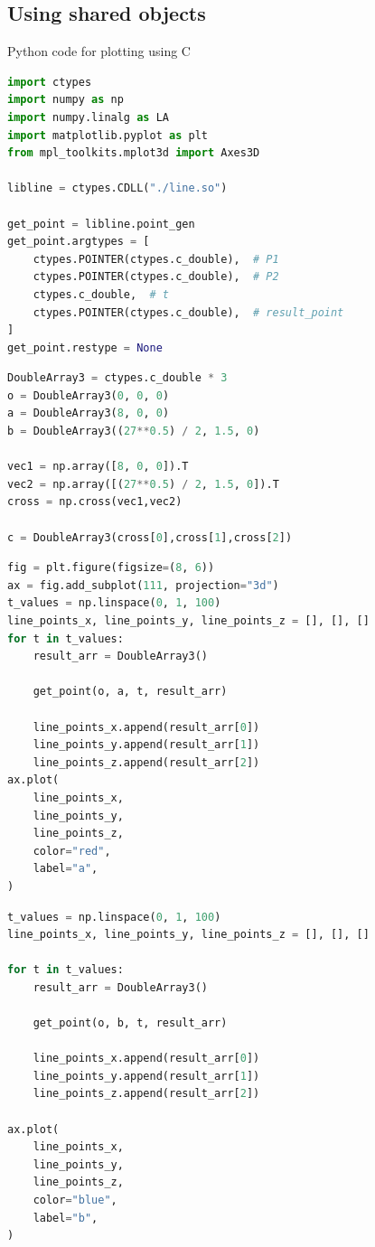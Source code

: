 \documentclass{beamer}
\theoremstyle{remark}
\numberwithin{equation}{section}
\begin{document}
\subsection{Using shared objects}
\begin{frame}[fragile]{Python code for plotting using C}
\begin{lstlisting}[language=Python]
import ctypes
import numpy as np
import numpy.linalg as LA
import matplotlib.pyplot as plt
from mpl_toolkits.mplot3d import Axes3D

libline = ctypes.CDLL("./line.so")

get_point = libline.point_gen
get_point.argtypes = [
    ctypes.POINTER(ctypes.c_double),  # P1
    ctypes.POINTER(ctypes.c_double),  # P2
    ctypes.c_double,  # t
    ctypes.POINTER(ctypes.c_double),  # result_point
]
get_point.restype = None
\end{lstlisting}
\end{frame}
\begin{frame}[fragile]
 \begin{lstlisting}[language=Python]
DoubleArray3 = ctypes.c_double * 3
o = DoubleArray3(0, 0, 0)
a = DoubleArray3(8, 0, 0)
b = DoubleArray3((27**0.5) / 2, 1.5, 0)

vec1 = np.array([8, 0, 0]).T
vec2 = np.array([(27**0.5) / 2, 1.5, 0]).T
cross = np.cross(vec1,vec2)

c = DoubleArray3(cross[0],cross[1],cross[2])
 \end{lstlisting}
\end{frame}
\begin{frame}[fragile]
 \begin{lstlisting}[language=Python]
fig = plt.figure(figsize=(8, 6))
ax = fig.add_subplot(111, projection="3d")
t_values = np.linspace(0, 1, 100)
line_points_x, line_points_y, line_points_z = [], [], []
for t in t_values:
    result_arr = DoubleArray3()

    get_point(o, a, t, result_arr)

    line_points_x.append(result_arr[0])
    line_points_y.append(result_arr[1])
    line_points_z.append(result_arr[2])
ax.plot(
    line_points_x,
    line_points_y,
    line_points_z,
    color="red",
    label="a",
)
 \end{lstlisting}
\end{frame}
\begin{frame}[fragile]
 \begin{lstlisting}[language=Python]
t_values = np.linspace(0, 1, 100)
line_points_x, line_points_y, line_points_z = [], [], []

for t in t_values:
    result_arr = DoubleArray3()

    get_point(o, b, t, result_arr)

    line_points_x.append(result_arr[0])
    line_points_y.append(result_arr[1])
    line_points_z.append(result_arr[2])

ax.plot(
    line_points_x,
    line_points_y,
    line_points_z,
    color="blue",
    label="b",
)
 \end{lstlisting}
\end{frame}
\end{document}
